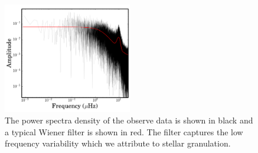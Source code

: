 \documentclass[apjl]{emulateapj}
\begin{document}





\begin{figure}
\includegraphics[width=0.50\textwidth]{filter.png}
\caption{The power spectra density of the observe data is shown in black and a typical Wiener filter is shown in red. The filter captures the low frequency variability which we attribute to stellar granulation. }
\label{fig:filter}
\end{figure}
\end{document}
